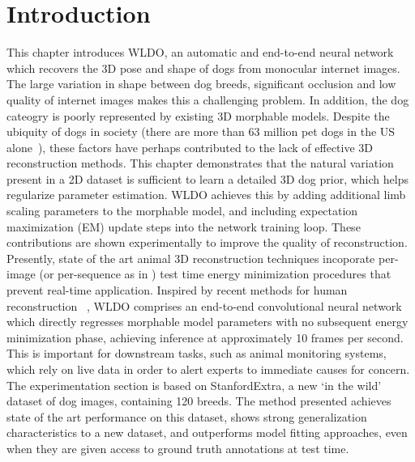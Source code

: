 
\section{Introduction}

This chapter introduces WLDO, an automatic and end-to-end neural network which recovers the 3D pose and shape of dogs from monocular internet images. The large variation in shape between dog breeds, significant occlusion and low quality of internet images makes this a challenging problem. In addition, the dog cateogry is poorly represented by existing 3D morphable models. Despite the ubiquity of dogs in society (there are more than 63 million pet dogs in the US alone~\cite{appa20}), these factors have perhaps contributed to the lack of effective 3D reconstruction methods. 
This chapter demonstrates that the natural variation present in a 2D dataset is sufficient to learn a detailed 3D dog prior, which helps regularize parameter estimation. WLDO achieves this by adding additional limb scaling parameters to the morphable model, and including expectation maximization (EM) update steps into the network training loop. These contributions are shown experimentally to improve the quality of reconstruction. 
Presently, state of the art animal 3D reconstruction techniques incoporate per-image (or per-sequence as in ) test time energy minimization procedures that prevent real-time application. Inspired by recent methods for human reconstruction ~\cite{kanazawa18end-to-end}, WLDO comprises an end-to-end convolutional neural network which directly regresses morphable model parameters with no subsequent energy minimization phase, achieving inference at approximately 10 frames per second. This is important for downstream tasks, such as animal monitoring systems, which rely on live data in order to alert experts to immediate causes for concern. 
The experimentation section is based on StanfordExtra, a new `in the wild' dataset of dog images, containing 120 breeds. The method presented achieves state of the art performance on this dataset, shows strong generalization characteristics to a new dataset, and outperforms model fitting approaches, even when they are given access to ground truth annotations at test time. 



